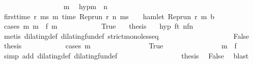 \begin{isabellebody}
\ \ \ \ \ \ \isamarkupfalse%
\ {\isacharminus}\isanewline
\ \ \ \ \ \ \isacommand{{\isacharbraceleft}}\isamarkupfalse%
\ \isamarkupfalse%
\ m\ \isamarkupfalse%
\ hyp{\isacharcolon}{\isacartoucheopen}m\ {\isasymge}\ n{\isacartoucheclose}\isanewline
\ \ \ \ \ \ \ \ \isamarkupfalse%
\ {\isacartoucheopen}first{\isacharunderscore}time\ r\ ms\ m\ {\isacharparenleft}time\ {\isacharparenleft}Rep{\isacharunderscore}run\ r\ n\ ms{\isacharparenright}\ {\isacharplus}\ {\isasymdelta}{\isasymtau}{\isacharparenright}\ {\isasymlongrightarrow}\ hamlet\ {\isacharparenleft}Rep{\isacharunderscore}run\ r\ m\ b{\isacharparenright}{\isacartoucheclose}\isanewline
\ \ \ \ \ \ \ \ \isamarkupfalse%
\ {\isacharparenleft}cases\ {\isacartoucheopen}{\isasymexists}m\ m\ {\isacharequal}\ f\ m\isanewline
\ \ \ \ \ \ \ \ \ \ \isamarkupfalse%
\ True\ \ \isamarkupfalse%
\ {\isacharquery}thesis\ \isamarkupfalse%
\ {\isacharasterisk}\ hyp\ ft{}\ nfn{}\isanewline
\ \ \ \ \ \ \ \ \ \ \ \ \isamarkupfalse%
\ {\isacharparenleft}metis\ dilating{\isacharunderscore}def\ dilating{\isacharunderscore}fun{\isacharunderscore}def\ strict{\isacharunderscore}mono{\isacharunderscore}less{\isacharunderscore}eq{\isacharparenright}\isanewline
\ \ \ \ \ \ \ \ \isamarkupfalse%
\isanewline
\ \ \ \ \ \ \ \ \ \ \isamarkupfalse%
\ False\ \isamarkupfalse%
\ {\isacharquery}thesis\isanewline
\ \ \ \ \ \ \ \ \ \ \isamarkupfalse%
\ {\isacharparenleft}cases\ {\isacartoucheopen}m\ {\isacharequal}\ {}{\isacartoucheclose}{\isacharparenright}\isanewline
\ \ \ \ \ \ \ \ \ \ \ \ \isamarkupfalse%
\ True\isanewline
\ \ \ \ \ \ \ \ \ \ \ \ \ \ \isamarkupfalse%
\ {\isacartoucheopen}m\ {\isacharequal}\ f\ {}{\isacartoucheclose}\ \isamarkupfalse%
\ {\isacharasterisk}\ \isamarkupfalse%
\ {\isacharparenleft}simp\ add{\isacharcolon}\ dilating{\isacharunderscore}def\ dilating{\isacharunderscore}fun{\isacharunderscore}def{\isacharparenright}\isanewline
\ \ \ \ \ \ \ \ \ \ \ \ \ \ \isamarkupfalse%
\ \isamarkupfalse%
\ {\isacharquery}thesis\ \isamarkupfalse%
\ False\ \isamarkupfalse%
\ blast\isanewline
\ \ \ \ \ \ \ \ \ \ \isamarkupfalse%

\end{isabellebody}
